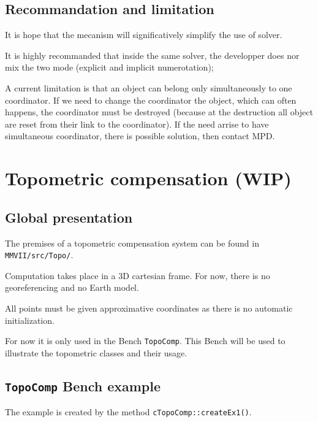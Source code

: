 \subsection{Recommandation and limitation}

It is hope that the mecanism will significatively simplify the use of solver.

It is highly recommanded that inside the same solver, the developper does nor mix the two
mode (explicit and implicit numerotation);

A current limitation is that an object can belong only simultaneously to one coordinator.
If we need to change the coordinator the object, which can often happens, the coordinator 
must be destroyed (because at the destruction all object are reset from their link to the
coordinator). If the need arrise to have simultaneous  coordinator, there is possible solution,
then contact MPD.




\section{Topometric compensation (WIP)}

\subsection{Global presentation}

The premises of a topometric compensation system can be found in \texttt{MMVII/src/Topo/}.

Computation takes place in a 3D cartesian frame. For now, there is no georeferencing
and no Earth model.

All points must be given approximative coordinates as there is no automatic initialization.

For now it is only used in the Bench \texttt{TopoComp}.
This Bench will be used to illustrate the topometric classes and their usage.


\subsection{\texttt{TopoComp} Bench example}
\label{subsec:topoBench}

The example is created by the method \texttt{cTopoComp::createEx1()}.

